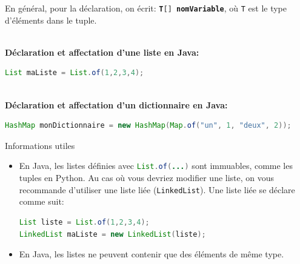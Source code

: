 En général, pour la déclaration, on écrit: \textbf{\lstinline[language=Java]|T[] nomVariable|}, où \texttt{T} est le type d'éléments dans le tuple.
              
    \textbf{\\ Déclaration et affectation d'une liste en Java:}
    
    \begin{lstlisting}[language=Java]
List maListe = List.of(1,2,3,4); \end{lstlisting}
            
    \textbf{\\ Déclaration et affectation d'un dictionnaire en Java:} 
    
    \begin{lstlisting}[language=Java]
HashMap monDictionnaire = new HashMap(Map.of("un", 1, "deux", 2)); \end{lstlisting}
              
    
    \begin{Example}{\faTerminal \quad Informations utiles}
        \begin{itemize}
            \item En Java, les listes définies avec \lstinline[language=Java]|List.of(...)| sont immuables, comme les tuples en Python. Au cas où vous devriez modifier une liste, on vous recommande d'utiliser une liste liée (\lstinline{LinkedList}). Une liste liée se déclare comme suit:
    
            \begin{lstlisting}[language=Java]
List liste = List.of(1,2,3,4);
LinkedList maListe = new LinkedList(liste); \end{lstlisting}
            \item En Java, les listes ne peuvent contenir que des éléments de même type.
        \end{itemize} 
        
    \end{Example}
	     
